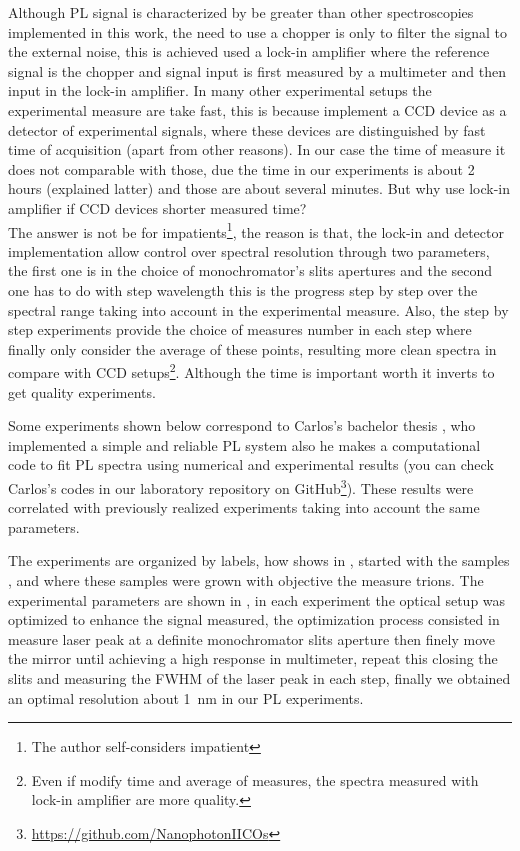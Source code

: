Although PL signal is characterized by be greater than other spectroscopies implemented in this work, the need to use a chopper is only to filter the signal to the external noise, this is achieved used a lock-in amplifier where the reference signal is the chopper and signal input is first measured by a multimeter and then input in the lock-in amplifier. In many other experimental setups the experimental measure are take  fast,  this is because  implement a CCD device as a detector of experimental signals, where  these devices are distinguished by fast time of acquisition (apart from other reasons). In our case the time of measure it does not comparable with those, due the time in our experiments is about 2 hours (explained latter) and those are about several minutes. But why use lock-in amplifier if CCD devices shorter measured time?\\
The answer is not be for impatients\footnote{The author self-considers impatient}, the reason is that, the lock-in and detector implementation allow control over spectral resolution through two parameters, the first one is in the choice of monochromator's slits apertures and the second one has to do with step wavelength this is the  progress step by step over the spectral range taking into account in the experimental measure. Also, the step by step experiments provide the choice of measures  number in each step where finally only consider the average of these points, resulting more clean spectra in compare with CCD setups\footnote{Even if modify time and average of measures, the spectra measured with lock-in amplifier are more quality.}. Although the time is important  worth it inverts  to  get quality experiments. 

Some experiments shown below correspond to Carlos's bachelor thesis \cite{carlos2020thesis}, who implemented a simple and reliable PL system also he makes a computational code to fit PL spectra using numerical and experimental results (you can check Carlos's codes in our laboratory  repository on GitHub\footnote{\url{https://github.com/NanophotonIICOs}}). These results were correlated with previously   realized  experiments taking into account the same parameters. 


The experiments are organized by labels, how shows in , started with the samples ,  and  where these samples were grown with objective the measure trions. The experimental parameters are shown in , in each experiment the optical setup was optimized to enhance the signal measured, the optimization process consisted in measure laser peak at a definite monochromator slits aperture then finely move the mirror until achieving a high response in multimeter, repeat this closing the slits and measuring the FWHM of the laser peak in each step, finally we obtained an optimal resolution about 1 nm in our \gls{PL} experiments. 

